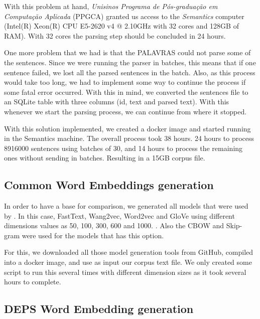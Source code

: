 With this problem at hand, \textit{Unisinos Programa de Pós-graduação em Computação Aplicada} (PPGCA) granted us access to the \textit{Semantics} computer (Intel(R) Xeon(R) CPU E5-2620 v4 @ 2.10GHz with 32 cores and 128GB of RAM). With 32 cores the parsing step should be concluded in 24 hours.

One more problem that we had is that the PALAVRAS could not parse some of the sentences. Since we were running the parser in batches, this means that if one sentence failed, we lost all the parsed sentences in the batch. Also, as this process would take too long, we had to implement some way to continue the process if some fatal error occurred. With this in mind, we converted the sentences file to an SQLite table with three columns (id, text and parsed text). With this whenever we start the parsing process, we can continue from where it stopped.

With this solution implemented, we created a docker image and started running in the Semantics machine. The overall process took 38 hours. 24 hours to process 8916000 sentences using batches of 30, and 14 hours to process the remaining ones without sending in batches. Resulting in a 15GB corpus file.

\subsection{Common Word Embeddings generation}

In order to have a base for comparison, we generated all models that were used by . In this case, FastText, Wang2vec, Word2vec and GloVe using different dimensions values as 50, 100, 300, 600 and 1000. \cite{bojanowski2016enriching, Ling:2015:naacl, Mikolov2013DistributedRO, Pennington2014}. Also the CBOW and Skip-gram were used for the models that has this option.

For this, we downloaded all those model generation tools from GitHub, compiled into a docker image, and use as input our corpus text file. We only created some script to run this several times with different dimension sizes as it took several hours to complete.


\subsection{DEPS Word Embedding generation}

